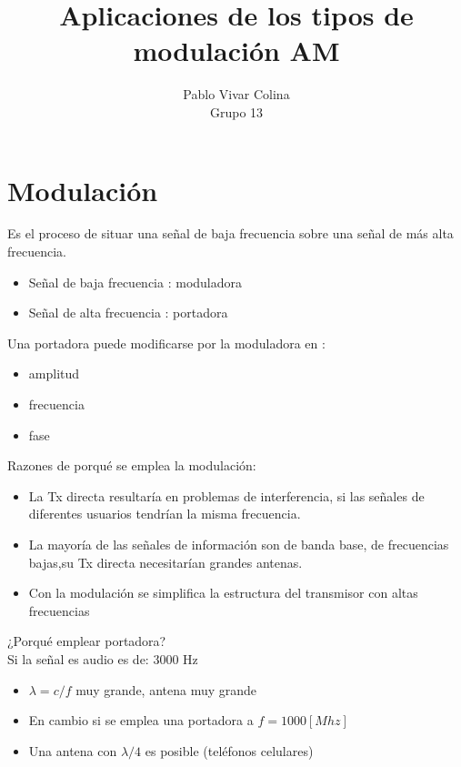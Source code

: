 \documentclass{article}
\title{Aplicaciones de los tipos de modulación AM }
\author{Pablo Vivar Colina\\
Grupo 13
}
\begin{document}
\maketitle

\section{Modulación}

Es el proceso de situar una señal de baja frecuencia sobre una señal de más alta frecuencia.\\

\begin{itemize}
    \item  Señal de baja frecuencia   :     moduladora
    \item Señal de alta frecuencia    :     portadora
\end{itemize}

Una portadora puede modificarse por la moduladora en :\\

\begin{itemize}
    \item amplitud
    \item frecuencia
      \item  fase
\end{itemize}

Razones de porqué se emplea la modulación:\\

\begin{itemize}
    \item La Tx directa  resultaría en problemas de interferencia, si las señales de diferentes usuarios  tendrían la misma frecuencia.
   \item  La mayoría de las señales  de información son de banda base, de frecuencias bajas,su Tx directa necesitarían grandes antenas. 
   \item  Con la modulación se simplifica la estructura del transmisor con altas frecuencias 
\end{itemize}

¿Porqué emplear portadora?\\
Si la señal es audio  es de: 3000 Hz\\

\begin{itemize}
    \item $\lambda=  c/f$     muy grande,
                                                                       antena muy grande

    \item En cambio si se emplea una portadora   a 
                                                                       $f = 1000 [Mhz]$
    \item  Una antena con $\lambda/4$ es posible (teléfonos celulares)\citep{Tomasi}\\
\end{itemize}
\end{document}
